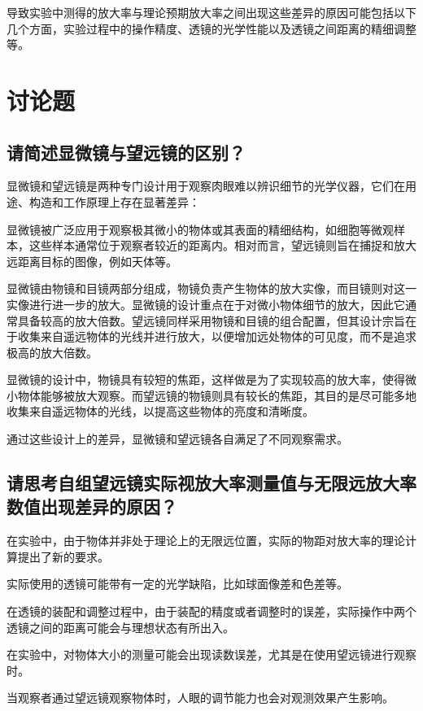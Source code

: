 \documentclass[signature=data]{physicsreport}
\begin{document}
导致实验中测得的放大率与理论预期放大率之间出现这些差异的原因可能包括以下几个方面，实验过程中的操作精度、透镜的光学性能以及透镜之间距离的精细调整等。

\hspace{2em}

\section{讨论题}

\subsection{请简述显微镜与望远镜的区别？}

显微镜和望远镜是两种专门设计用于观察肉眼难以辨识细节的光学仪器，它们在用途、构造和工作原理上存在显著差异：

 显微镜被广泛应用于观察极其微小的物体或其表面的精细结构，如细胞等微观样本，这些样本通常位于观察者较近的距离内。相对而言，望远镜则旨在捕捉和放大远距离目标的图像，例如天体等。

 显微镜由物镜和目镜两部分组成，物镜负责产生物体的放大实像，而目镜则对这一实像进行进一步的放大。显微镜的设计重点在于对微小物体细节的放大，因此它通常具备较高的放大倍数。望远镜同样采用物镜和目镜的组合配置，但其设计宗旨在于收集来自遥远物体的光线并进行放大，以便增加远处物体的可见度，而不是追求极高的放大倍数。

 显微镜的设计中，物镜具有较短的焦距，这样做是为了实现较高的放大率，使得微小物体能够被放大观察。而望远镜的物镜则具有较长的焦距，其目的是尽可能多地收集来自遥远物体的光线，以提高这些物体的亮度和清晰度。

通过这些设计上的差异，显微镜和望远镜各自满足了不同观察需求。

\hspace{2em}

\subsection{请思考自组望远镜实际视放大率测量值与无限远放大率数值出现差异的原因？}

在实验中，由于物体并非处于理论上的无限远位置，实际的物距对放大率的理论计算提出了新的要求。

实际使用的透镜可能带有一定的光学缺陷，比如球面像差和色差等。

在透镜的装配和调整过程中，由于装配的精度或者调整时的误差，实际操作中两个透镜之间的距离可能会与理想状态有所出入。

在实验中，对物体大小的测量可能会出现读数误差，尤其是在使用望远镜进行观察时。

当观察者通过望远镜观察物体时，人眼的调节能力也会对观测效果产生影响。
\end{document}

